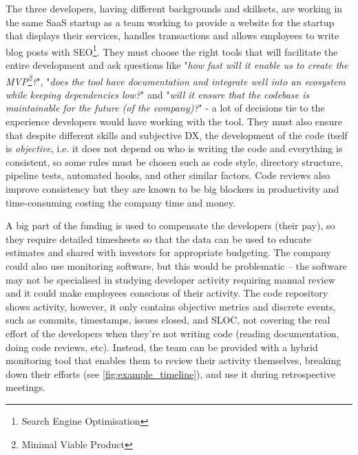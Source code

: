 \documentclass[../mpaper.tex]{subfiles}
\begin{document}
The three developers, having different backgrounds and skillsets, are working in the same SaaS startup as a team working to provide a website for the startup that displays their services, handles transactions and allows employees to write blog posts with SEO\footnote{Search Engine Optimisation}. They must choose the right tools that will facilitate the entire development and ask questions like "\textit{how fast will it enable us to create the MVP\footnote{Minimal Viable Product}?}", "\textit{does the tool have documentation and integrate well into an ecosystem while keeping dependencies low?}" and "\textit{will it ensure that the codebase is maintainable for the future (of the company)?}" - a lot of decisions tie to the experience developers would have working with the tool. %
They must also ensure that despite different skills and subjective DX, the development of the code itself is \textit{objective}, i.e. it does not depend on who is writing the code and everything is consistent, so some rules must be chosen such as code style, directory structure, pipeline tests, automated hooks, and other similar factors. Code reviews also improve consistency but they are known to be big blockers in productivity and time-consuming \cite{canedoFactorsAffectingSoftware2019} costing the company time and money.

A big part of the funding is used to compensate the developers (their pay), so they require detailed timesheets so that the data can be used to educate estimates and shared with investors for appropriate budgeting. The company could also use monitoring software, but this would be problematic -- the software may not be specialised in studying developer activity requiring manual review and it could make employees conscious of their activity. The code repository shows activity, however, it only contains objective metrics and discrete events, such as commits, timestamps, issues closed, and SLOC, not covering the real effort of the developers when they're not writing code (reading documentation, doing code reviews, etc). Instead, the team can be provided with a hybrid monitoring tool that enables them to review their activity themselves, breaking down their efforts (see \autoref{fig:example_timeline}), and use it during retrospective meetings.
\end{document}
